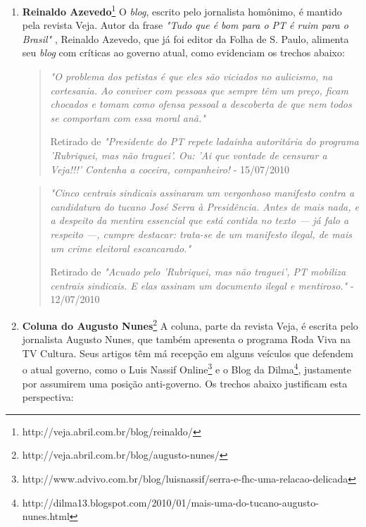 \begin{enumerate}

\item \textbf{Reinaldo Azevedo}\footnote{http://veja.abril.com.br/blog/reinaldo/} O \emph{blog}, escrito pelo jornalista homônimo, é mantido pela revista Veja. Autor da frase \emph{"Tudo que é bom para o PT é ruim para o Brasil"} \cite{bom-pt-mau-brasil}, Reinaldo Azevedo, que já foi editor da Folha de S. Paulo, alimenta seu \emph{blog} com críticas ao governo atual, como evidenciam os trechos abaixo:

\begin{quote}

\emph{"O problema dos petistas é que eles são viciados no aulicismo, na cortesania. Ao conviver com pessoas que sempre têm um preço, ficam chocados e tomam como ofensa pessoal a descoberta de que nem todos se comportam com essa moral anã."}

{\small Retirado de \emph{"Presidente do PT repete ladainha autoritária do programa 'Rubriquei, mas não traguei'. Ou: 'Ai que vontade de censurar a Veja!!!' Contenha a coceira, companheiro!} - 15/07/2010} 
\end{quote}

\begin{quote}

\emph{"Cinco centrais sindicais assinaram um vergonhoso manifesto contra a candidatura do tucano José Serra à Presidência. Antes de mais nada, e a despeito da mentira essencial que está contida no texto — já falo a respeito —, cumpre destacar: trata-se de um manifesto ilegal, de mais um crime eleitoral escancarado."}

{\small Retirado de \emph{"Acuado pelo 'Rubriquei, mas não traguei', PT mobiliza centrais sindicais. E elas assinam um documento ilegal e mentiroso."} - 12/07/2010 }

\end{quote}

\item \textbf{Coluna do Augusto Nunes}\footnote{http://veja.abril.com.br/blog/augusto-nunes/} A coluna, parte da revista Veja, é escrita pelo jornalista Augusto Nunes, que também apresenta o programa Roda Viva na TV Cultura. Seus artigos têm má recepção em alguns veículos que defendem o atual governo, como o Luis Nassif Online\footnote{http://www.advivo.com.br/blog/luisnassif/serra-e-fhc-uma-relacao-delicada} e o Blog da Dilma\footnote{http://dilma13.blogspot.com/2010/01/mais-uma-do-tucano-augusto-nunes.html}, justamente por assumirem uma posição anti-governo. Os trechos abaixo justificam esta perspectiva:



\end{enumerate}
